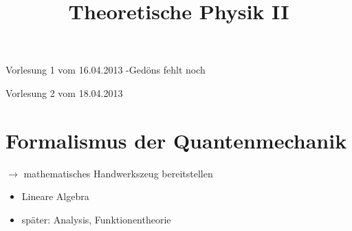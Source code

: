 \documentclass[10pt,article,colorback,accentcolor=tud9d]{scrartcl}
\title{Theoretische Physik II}
\begin{document}
\maketitle
\tableofcontents
\newpage
\noindent Vorlesung 1 vom 16.04.2013 -Gedöns fehlt noch\\
\begin{flushright}Vorlesung 2 vom 18.04.2013\end{flushright}
\section{Formalismus der Quantenmechanik}
$\rightarrow$ mathematisches Handwerkszeug bereitstellen\\
\begin{itemize}
\item Lineare Algebra
\item später: Analysis, Funktionentheorie
\end{itemize}
\end{document}

